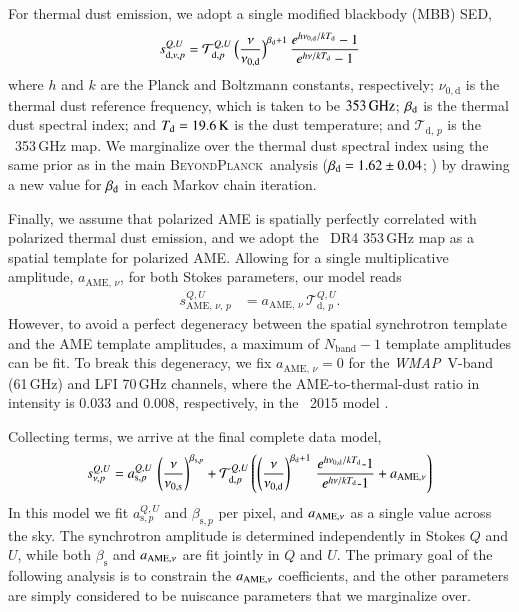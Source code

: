 \documentclass[twocolumn]{aa}
\def\WMAP{\textit{WMAP}}
\newcommand{\BP}{\textsc{BeyondPlanck}}
\begin{document}
For thermal dust emission, we adopt a single modified blackbody (MBB) SED,
\begin{equation}
{s}_{\mathrm{d},\nu,p}^{Q,U} = \mathcal{T}_{\mathrm{d},p}^{Q,U} \,\Big(\frac{\nu}{\nu_{0, \mathrm{d}}} \Big)^{\beta_{\rm d}+1}\, \frac{e^{h\nu_{0, \mathrm{d}}/kT_{\rm d}}-1}{e^{h\nu/kT_{\rm d}}-1}\label{eq:thermal}
\end{equation}
where $h$ and $k$ are the Planck and Boltzmann constants, respectively; $\nu_{0, \mathrm{d}}$ is the thermal dust reference frequency, which is taken to be $353\,{\rm GHz}$; ${\beta_{\rm d}}$ is the thermal dust spectral index; and $T_{\rm d}=19.6\,{\rm K}$ is the dust temperature; and $\mathcal{T}_{\mathrm{d},\,p}$ is the \Planck\ 353\,GHz map. We marginalize over the thermal dust spectral index using the same prior as in the main \BP\ analysis ($\beta_{\rm d} = 1.62 \pm 0.04$; \citealp{bp14}) by drawing a new value for $\beta_{\rm d}$ in each Markov chain iteration. 

Finally, we assume that polarized AME is spatially perfectly correlated with polarized thermal dust emission, and we adopt the \Planck\ DR4 353\,GHz map as a spatial template for polarized AME. Allowing for a single multiplicative amplitude, $a_{\mathrm{AME},\, \nu}$, for both Stokes parameters, our model reads
\begin{align}
s_{\mathrm{AME},\, \nu,\, p}^{Q,U} &=  a_{\mathrm{AME},\, \nu}\, \mathcal{T}_{\mathrm{d},\,p}^{Q,U}.
\label{eq:AME}
\end{align}
However, to avoid a
perfect degeneracy between the spatial synchrotron template and the
AME template amplitudes, a maximum of $N_\mathrm{band}-1$ template
amplitudes can be fit. To break this degeneracy, we fix
$a_{\mathrm{AME},\, \nu}=0$ for the \WMAP\ V-band (61\,GHz) and LFI
70\,GHz channels, where the AME-to-thermal-dust ratio in intensity is
$0.033$ and $0.008$, respectively, in the \Planck\ 2015 model
\citep{planck2014-a12}.

Collecting terms, we arrive at the final complete data model,
\begin{equation}
s_{\nu,p}^{Q,U} = a_{\mathrm{s},p}^{Q,U} \,\left(\frac{\nu}{\nu_{\rm 0, s}}\right)^{\beta_{\mathrm{s},p}} + \mathcal{T}_{\mathrm{d},p}^{Q,U}\left(\left(\frac{\nu}{\nu_{0, \mathrm{d}}} \right)^{\beta_{\mathrm{d}}+1}\, \frac{e^{h\nu_{0, \mathrm{d}}/kT_{\rm d}}\text{-}1}{e^{h\nu/kT_{\rm d}}\text{-}1} + a_{\mathrm{AME}, \nu} \right)\label{eq:data_model_full}
\end{equation}
In this model we fit $a_{\mathrm{s},p}^{Q,U}$ and $\beta_{\mathrm{s},p}$ per pixel, and $a_{\rm AME,\nu}$ as a single value across the sky. The synchrotron amplitude is determined independently in Stokes $Q$ and $U$, while both $\beta_{\mathrm{s}}$ and $a_{\rm AME,\nu}$ are fit jointly in $Q$ and $U$. The primary goal of the following analysis is to constrain the $a_{\rm AME,\nu}$ coefficients, and the other parameters are simply considered to be nuiscance parameters that we marginalize over.
\end{document}
